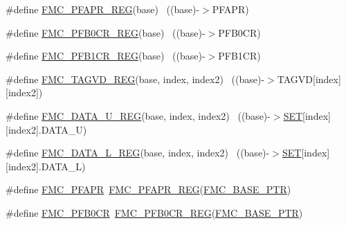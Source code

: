 \begin{DoxyCompactItemize}
\item 
\#define \hyperlink{group___f_m_c___register___accessor___macros_gad43fcfd90789921daaef07d85d5da199}{F\+M\+C\+\_\+\+P\+F\+A\+P\+R\+\_\+\+R\+EG}(base)                                        ~((base)-\/$>$P\+F\+A\+PR)
\item 
\#define \hyperlink{group___f_m_c___register___accessor___macros_gabab99bf1038b07a5ffe56d7075184b65}{F\+M\+C\+\_\+\+P\+F\+B0\+C\+R\+\_\+\+R\+EG}(base)                                      ~((base)-\/$>$P\+F\+B0\+CR)
\item 
\#define \hyperlink{group___f_m_c___register___accessor___macros_gaf6b5ee99ce57d8870974b8bc5928a19f}{F\+M\+C\+\_\+\+P\+F\+B1\+C\+R\+\_\+\+R\+EG}(base)                                      ~((base)-\/$>$P\+F\+B1\+CR)
\item 
\#define \hyperlink{group___f_m_c___register___accessor___macros_ga69adb2f34bbe33d04c2075cee0e7d5f4}{F\+M\+C\+\_\+\+T\+A\+G\+V\+D\+\_\+\+R\+EG}(base,  index,  index2)              ~((base)-\/$>$T\+A\+G\+VD\mbox{[}index\mbox{]}\mbox{[}index2\mbox{]})
\item 
\#define \hyperlink{group___f_m_c___register___accessor___macros_ga77e953c0a13be535a400b4fce86c0601}{F\+M\+C\+\_\+\+D\+A\+T\+A\+\_\+\+U\+\_\+\+R\+EG}(base,  index,  index2)            ~((base)-\/$>$\hyperlink{group___l_p_c___types___public___types_gga89136caac2e14c55151f527ac02daaffab44c8101cc294c074709ec1b14211792}{S\+ET}\mbox{[}index\mbox{]}\mbox{[}index2\mbox{]}.D\+A\+T\+A\+\_\+U)
\item 
\#define \hyperlink{group___f_m_c___register___accessor___macros_ga4a86395060ba1ded814dbe8cc6eb0e8c}{F\+M\+C\+\_\+\+D\+A\+T\+A\+\_\+\+L\+\_\+\+R\+EG}(base,  index,  index2)            ~((base)-\/$>$\hyperlink{group___l_p_c___types___public___types_gga89136caac2e14c55151f527ac02daaffab44c8101cc294c074709ec1b14211792}{S\+ET}\mbox{[}index\mbox{]}\mbox{[}index2\mbox{]}.D\+A\+T\+A\+\_\+L)
\item 
\#define \hyperlink{group___f_m_c___register___accessor___macros_gafb8a8e5f889afe248ded426a27574f2e}{F\+M\+C\+\_\+\+P\+F\+A\+PR}~\hyperlink{group___f_m_c___register___accessor___macros_gad43fcfd90789921daaef07d85d5da199}{F\+M\+C\+\_\+\+P\+F\+A\+P\+R\+\_\+\+R\+EG}(\hyperlink{group___f_m_c___peripheral_ga0a740437b573e32e6b932bf729485fd9}{F\+M\+C\+\_\+\+B\+A\+S\+E\+\_\+\+P\+TR})
\item 
\#define \hyperlink{group___f_m_c___register___accessor___macros_ga6db90dbda9bc68851c6e87c489f18d73}{F\+M\+C\+\_\+\+P\+F\+B0\+CR}~\hyperlink{group___f_m_c___register___accessor___macros_gabab99bf1038b07a5ffe56d7075184b65}{F\+M\+C\+\_\+\+P\+F\+B0\+C\+R\+\_\+\+R\+EG}(\hyperlink{group___f_m_c___peripheral_ga0a740437b573e32e6b932bf729485fd9}{F\+M\+C\+\_\+\+B\+A\+S\+E\+\_\+\+P\+TR})

\end{DoxyCompactItemize}
